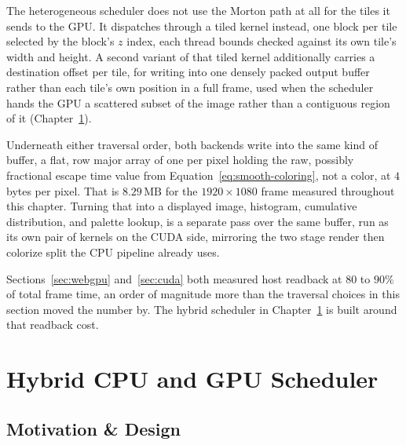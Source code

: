 \documentclass{ftndiplomski}
\begin{document}
The heterogeneous scheduler does not use the Morton path at all for the tiles it sends to the GPU.
It dispatches through a tiled kernel instead, one block per tile selected by the block's $z$ index,
each thread bounds checked against its own tile's width and height. A second variant of that tiled
kernel additionally carries a destination offset per tile, for writing into one densely packed
output buffer rather than each tile's own position in a full frame, used when the scheduler hands
the GPU a scattered subset of the image rather than a contiguous region of it
(Chapter~\ref{ch:scheduler}).

Underneath either traversal order, both backends write into the same kind of buffer, a flat,
row major array of one  per pixel holding the raw, possibly fractional escape time value
from Equation~\ref{eq:smooth-coloring}, not a color, at $4$ bytes per pixel. That is
$8.29\,\mathrm{MB}$ for the $1920\times1080$ frame measured throughout this chapter. Turning that
into a displayed image, histogram, cumulative distribution, and palette lookup, is a separate pass
over the same buffer, run as its own pair of kernels on the CUDA side, mirroring the two stage
render then colorize split the CPU pipeline already uses.

Sections~\ref{sec:webgpu} and~\ref{sec:cuda} both measured host readback at $80$ to $90\%$ of total
frame time, an order of magnitude more than the traversal choices in this section moved the number
by. The hybrid scheduler in Chapter~\ref{ch:scheduler} is built around that readback cost.

\chapter{Hybrid CPU and GPU Scheduler}
\label{ch:scheduler}

\section{Motivation \& Design}
\label{sec:scheduler-motivation}
\end{document}
